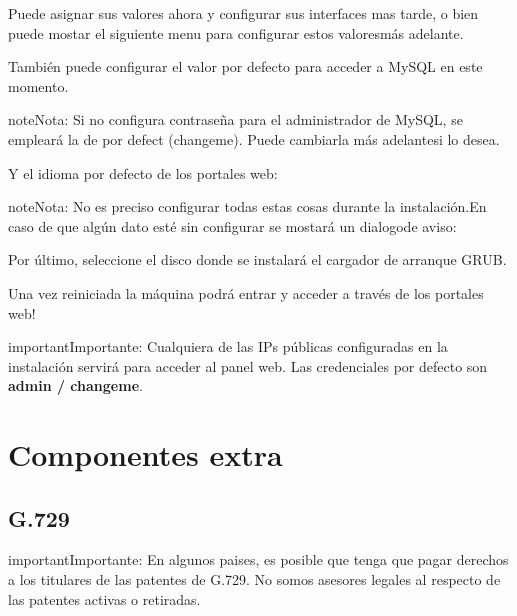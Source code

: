 \documentclass[letterpaper,10pt,spanish]{sphinxmanual}
\begin{document}
Puede asignar sus valores ahora y configurar sus interfaces mas tarde, o bien puede mostar el siguiente menu para configurar estos valoresmás adelante.

\noindent{}

También puede configurar el valor por defecto para acceder a MySQL en este momento.

\begin{notice}{note}{Nota:}
Si no configura contraseña para el administrador de MySQL, se empleará la de por defect (changeme). Puede cambiarla más adelantesi lo desea.
\end{notice}

\noindent{}

Y el idioma por defecto de los portales web:

\noindent{}

\begin{notice}{note}{Nota:}
No es preciso configurar todas estas cosas durante la instalación.En caso de que algún dato esté sin configurar se mostará un dialogode aviso:
\end{notice}

\noindent{}

Por último, seleccione el disco donde se instalará el cargador de arranque GRUB.

\noindent{}

Una vez reiniciada la máquina podrá entrar y acceder a través de los portales web!

\begin{notice}{important}{Importante:}
Cualquiera de las IPs públicas configuradas en la instalación servirá para acceder al panel web. Las credenciales por defecto son \textbf{admin / changeme}.
\end{notice}


\section{Componentes extra}
\label{installation/extra_components::doc}\label{installation/extra_components:extra-components}

\subsection{G.729}
\label{installation/extra_components:g-729}
\begin{notice}{important}{Importante:}
En algunos paises, es posible que tenga que pagar derechos a los titulares de las patentes de G.729. No somos asesores legales al respecto de las patentes activas o retiradas.
\end{notice}
\end{document}
